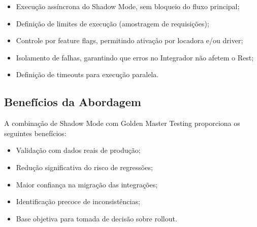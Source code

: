 \begin{itemize}
    \item Execução assíncrona do Shadow Mode, sem bloqueio do fluxo principal;
    \item Definição de limites de execução (amostragem de requisições);
    \item Controle por feature flags, permitindo ativação por locadora e/ou driver;
    \item Isolamento de falhas, garantindo que erros no Integrador não afetem o Rest;
    \item Definição de timeouts para execução paralela.
\end{itemize}

\subsection{Benefícios da Abordagem}
A combinação de Shadow Mode com Golden Master Testing proporciona os seguintes benefícios:

\begin{itemize}
    \item Validação com dados reais de produção;
    \item Redução significativa do risco de regressões;
    \item Maior confiança na migração das integrações;
    \item Identificação precoce de inconsistências;
    \item Base objetiva para tomada de decisão sobre rollout.
\end{itemize}

